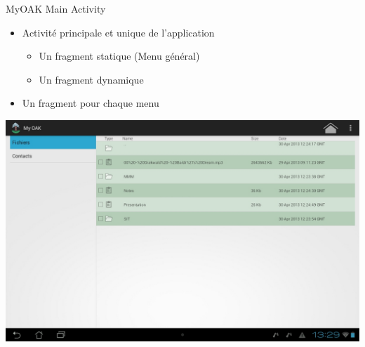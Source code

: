 \begin{frame}{MyOAK Main Activity}
	\begin{itemize}
		\item Activité principale et unique de l’application
			\begin{itemize}
			\item Un fragment statique (Menu général)
			\item Un fragment dynamique
			\end{itemize}
		\item Un fragment pour chaque menu
	\end{itemize}
	\hspace{1.2cm}  \includegraphics[scale=0.18]{img/screenshot}
\end{frame}	
